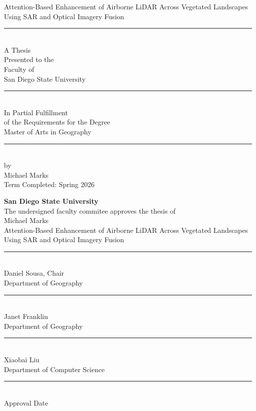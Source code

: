 \documentclass[12pt]{report}
\newcommand{\thesistitle}{Attention-Based Enhancement of Airborne LiDAR Across Vegetated Landscapes Using SAR and Optical Imagery Fusion}
\newcommand{\thesisauthor}{Michael Marks}
\newcommand{\thesisdegree}{Master of Arts in Geography}
\begin{document}

\begin{titlepage}
\begin{center}
\vspace*{1in}
{\Large \thesistitle}\\[2.5cm]

\rule{1.2in}{0.1pt}\\[1cm]



A Thesis \\[0.1cm]Presented to the \\[0.1cm]Faculty of\\[0.1cm]San Diego State University\\[1cm]
\rule{1.2in}{0.1pt}\\[1cm]
In Partial Fulfillment \\[0.1cm]
of the Requirements for the Degree\\[0.1cm]
\thesisdegree\\[1cm]
\rule{1.2in}{0.1pt}\\[1cm]
by\\[0.5cm]

{\thesisauthor}\\[0.5cm]
Term Completed: Spring 2026
\vfill

\end{center}
\end{titlepage}

\newpage
\thispagestyle{empty}
\begin{center}
\textbf{San Diego State University}\\[1.2cm]


\noindent
The undersigned faculty commitee approves the thesis of\\[0.3cm]
\thesisauthor\\[2cm]


\noindent
\thesistitle\\[3.5cm]

\noindent
\rule{3in}{0.4pt}\\
Daniel Sousa, Chair\\
Department of Geography\\[1.7cm]

\noindent
\rule{3in}{0.4pt}\\
Janet Franklin\\
Department of Geography\\[1.7cm]

\noindent
\rule{3in}{0.4pt}\\
Xiaobai Liu\\
Department of Computer Science\\[2.1cm]

\noindent
\rule{2in}{0.4pt}\\
Approval Date\\
\end{center}
\newpage
\end{document}
